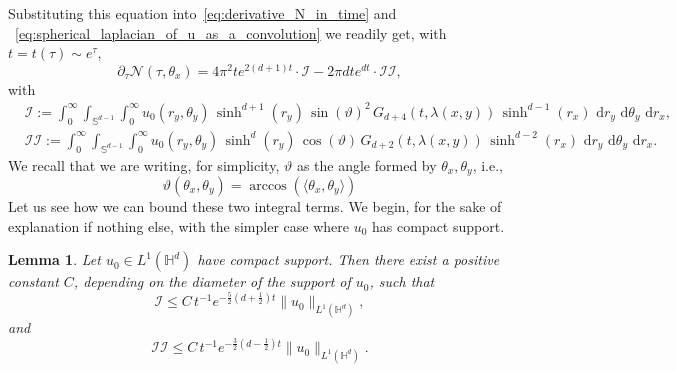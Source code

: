 \documentclass[12pt,longbibliography]{article}
\def\d{\,\mathrm{d}}
\def\d{\,\mathrm{d}}
\def\H{\mathbb{H}}
\newtheorem{lem}[thm]{Lemma}
\theoremstyle{definition}
\theoremstyle{remark}
\theoremstyle{example}
\begin{document}
Substituting this equation into~\eqref{eq:derivative_N_in_time} and ~\eqref{eq:spherical_laplacian_of_u_as_a_convolution}  we readily get, with $t=t(\tau)\sim e^\tau$,
\begin{equation}\label{eq:formula_for_derivative_N_in_time}
	\partial_\tau \mathcal{N}(\tau,\theta_x) =  4\pi^2 t e^{2(d+1)t}\cdot \mathcal{I}-  2\pi d t e^{dt}\cdot\mathcal{II},
\end{equation}
with
\[
\begin{aligned}
	&\mathcal{I} := \int_0^\infty \int_{\mathbb{S}^{d-1}}\int_{0}^\infty u_0(r_y, \theta_y)\, \sinh^{d+1}(r_y)\,\sin (\vartheta)^2\, G_{d+4}(t,\lambda(x,y))\, \sinh^{d-1}(r_x)\,\d r_y\,\d \theta_y  \, \d r_x,\\[10pt]
	&\mathcal{II} :=\int_0^\infty \int_{\mathbb{S}^{d-1}}\int_{0}^\infty u_0(r_y, \theta_y)\, \sinh^{d}(r_y)\, \cos (\vartheta) \, G_{d+2}(t,\lambda(x,y))\, \sinh^{d-2}(r_x)\,\d r_y\,\d \theta_y  \, \d r_x.
\end{aligned}
\]	
We recall that we are writing, for simplicity, $\vartheta$ as the angle formed by $\theta_x,\theta_y$, i.e.,
\[
\vartheta(\theta_x,\theta_y) = \arccos(\langle\theta_x,\theta_y\rangle)
\]
Let us see how we can bound these two integral terms. We begin, for the sake of explanation if nothing else, with the simpler case where $u_0$ has compact support.
\begin{lem}\label{lem:bound_derivative_N_when_u_0_compact_support}
	Let $u_0\in L^1(\H^d)$ have compact support. Then there exist a positive constant $C$, depending on the diameter of the support of $u_0$, such that
	\[
	\mathcal{I} \leq C\, t^{-1}e^{-\frac{5}{2}\left(d+\frac{1}{2}\right)t}\|u_0\|_{L^1(\H^d)},
	\]
	and
	\[
	\mathcal{II} \leq C\, t^{-1}e^{-\frac{3}{2}\left(d-\frac{1}{2}\right)t}\|u_0\|_{L^1(\H^d)}.
	\]
\end{lem}
\end{document}
